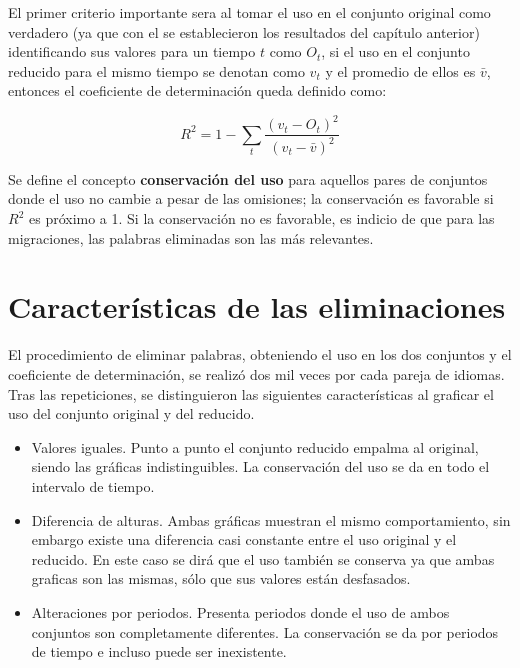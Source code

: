 El primer criterio importante sera al tomar el uso en el conjunto original como verdadero (ya que con el se establecieron los resultados del capítulo anterior) identificando sus valores para un tiempo $t$ como $O_{t}$, si el uso en el conjunto reducido para el mismo tiempo se denotan como  $v_{t}$ y el promedio de ellos es $\bar{v}$, entonces   el coeficiente de determinación queda definido como:

\begin{equation}
\label{ec.dif_uso}
R^{2} = 1 - \sum_{t} \frac{ \left( v_{t}- O_{t} \right)^{2}  }{ \left( v_{t} - \bar{v} \right)^{2} }
\end{equation}

Se define el concepto \textbf{conservación del uso} para aquellos pares de conjuntos donde el uso no cambie a pesar de las omisiones; la conservación es favorable si $R^{2}$ es próximo a 1.  Si la conservación no es favorable, es indicio de que para las migraciones, las palabras eliminadas son las más relevantes.

\section{Características de las eliminaciones}

El procedimiento de eliminar palabras, obteniendo el uso en los dos conjuntos y el coeficiente de determinación, se realizó dos mil veces por cada pareja de idiomas.  Tras las repeticiones, se distinguieron las siguientes características al graficar el uso del conjunto original y del reducido. 


\begin{itemize}
	
	\item Valores iguales. Punto a punto el conjunto reducido empalma al original, siendo las gráficas indistinguibles. La conservación del uso se da en todo el intervalo de tiempo. 
	
	\item Diferencia de alturas. Ambas gráficas muestran el mismo comportamiento, sin embargo existe una diferencia casi constante entre el uso original y el reducido. En este caso se dirá que el uso también se conserva ya que ambas graficas son las mismas, sólo que sus valores están desfasados. 
	
	\item Alteraciones por periodos.  Presenta periodos donde el uso de ambos conjuntos son completamente diferentes. La conservación se da por periodos de tiempo e incluso puede ser inexistente.
	
\end{itemize}

